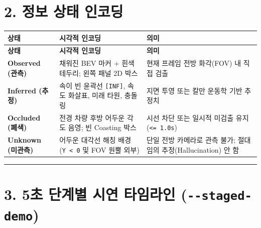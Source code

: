 \documentclass[10.5pt,a4paper]{article}
\begin{document}
\section{2. 정보 상태 인코딩}


\begin{footnotesize}
\setlength{\tabcolsep}{4pt}
\setlength{\LTleft}{0pt}\setlength{\LTright}{0pt}
\begin{longtable}{>{\raggedright\arraybackslash}p{} >{\raggedright\arraybackslash}p{} >{\raggedright\arraybackslash}p{}}
\toprule
\textbf{상태} & \textbf{시각적 인코딩} & \textbf{의미} \\
\midrule
\endfirsthead
\toprule
\textbf{상태} & \textbf{시각적 인코딩} & \textbf{의미} \\
\midrule
\endhead
\bottomrule
\endfoot
\textbf{Observed (관측)} & 채워진 BEV 마커 + 흰색 테두리; 왼쪽 패널 2D 박스 & 현재 프레임 전방 화각(FOV) 내 직접 검출 \\
\textbf{Inferred (추정)} & 속이 빈 윤곽선 \texttt{[INF]}, 속도 화살표, 미래 타원, 충돌 링 & 지면 투영 또는 칼만 운동학 기반 추정치 \\
\textbf{Occluded (폐색)} & 전경 차량 후방 어두운 각도 음영; 빈 Coasting 박스 & 시선 차단 또는 일시적 미검출 유지 (\texttt{<= 1.\allowbreak{}0s}) \\
\textbf{Unknown (미관측)} & 어두운 대각선 해칭 배경 (\texttt{Y < 0} 및 FOV 원뿔 외부) & 단일 전방 카메라로 관측 불가; 절대 임의 추정(Hallucination) 안 함 \\
\end{longtable}
\end{footnotesize}


\par\noindent\rule{\textwidth}{0.4pt}\par\medskip

\section{3. 5초 단계별 시연 타임라인 (\texttt{-\allowbreak{}-\allowbreak{}staged-\allowbreak{}demo})}
\end{document}
